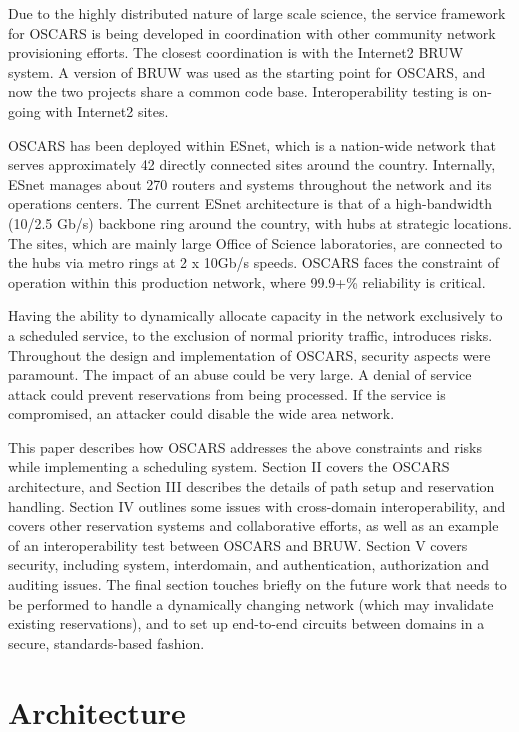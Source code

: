 \documentclass[conference]{IEEEtran}
\begin{document}
Due to the highly distributed nature of large scale science,
the service framework for OSCARS is being
developed in coordination with other community network provisioning efforts. 
The closest coordination is with the Internet2 BRUW \cite{BRUW}
system. 
A version of BRUW was used as the starting point for OSCARS, and now the two 
projects share a common code base. Interoperability testing is on-going with 
Internet2 sites. 

OSCARS has been deployed within ESnet,
which is a nation-wide network that serves approximately 42 directly connected 
sites around the country.  Internally, ESnet manages about 270 routers and 
systems throughout the network and its operations centers.  The current ESnet 
architecture is that of a high-bandwidth (10/2.5 Gb/s) backbone ring 
around the country, with hubs at strategic locations.  The sites, which are 
mainly
large Office of Science laboratories, are connected to the hubs via metro rings at 2 x 10Gb/s speeds.
OSCARS faces the constraint of operation within this production 
network, where 99.9+\% reliability is critical.

Having the ability to dynamically allocate capacity in the network exclusively 
to a scheduled service, to the exclusion of normal priority traffic, introduces 
risks.
Throughout the design and implementation of OSCARS, security aspects were
paramount.  The impact of an abuse could be very
large.  A denial of service attack could prevent reservations from being 
processed.  If the
service is compromised, an attacker could disable the wide area network.

This paper describes how OSCARS addresses the above constraints and
risks while implementing a scheduling system.  Section II covers the 
OSCARS architecture, and Section III describes the details of
path setup and reservation handling. Section IV outlines some issues with cross-domain
interoperability, and covers other reservation systems and 
collaborative efforts, as well as 
an example of an interoperability test between OSCARS and BRUW.
Section V covers security, including system, interdomain, and authentication,
authorization and auditing issues.
The final section touches briefly on the future work that needs to be performed
to handle a dynamically changing network (which may invalidate existing
reservations), and to set up end-to-end circuits between domains
in a secure, standards-based fashion.

\section{Architecture}
\end{document}
